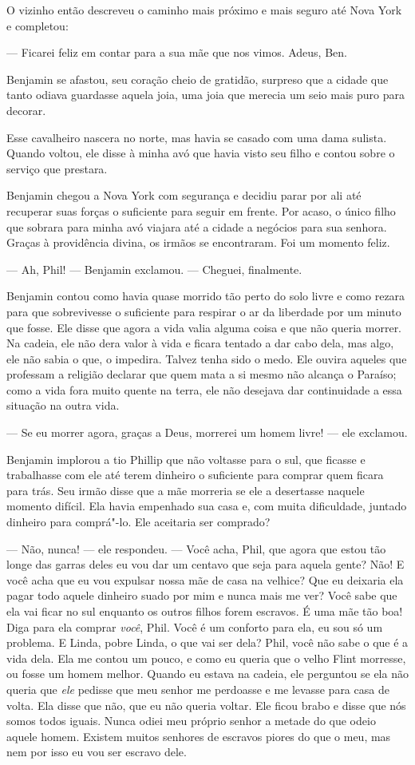 O vizinho então descreveu o caminho mais próximo e mais seguro até Nova
York e completou:

--- Ficarei feliz em contar para a sua mãe que nos vimos. Adeus, Ben.

Benjamin se afastou, seu coração cheio
de gratidão, surpreso que a cidade que tanto odiava guardasse aquela
joia, uma joia que merecia um seio mais puro para decorar.

Esse cavalheiro nascera no norte, mas
havia se casado com uma dama sulista. Quando voltou, ele disse à minha
avó que havia visto seu filho e contou sobre o serviço que prestara.

Benjamin chegou a Nova York com
segurança e decidiu parar por ali até recuperar suas forças o suficiente
para seguir em frente. Por acaso, o único filho que sobrara para minha
avó viajara até a cidade a negócios para sua senhora. Graças à
providência divina, os irmãos se encontraram. Foi um momento feliz.

--- Ah, Phil! --- Benjamin exclamou. --- Cheguei, finalmente.

Benjamin contou como havia quase morrido tão perto do solo livre e como
rezara para que sobrevivesse o suficiente para respirar o ar da
liberdade por um minuto que fosse. Ele disse que agora a vida valia
alguma coisa e que não queria morrer. Na cadeia, ele não dera valor à
vida e ficara tentado a dar cabo dela, mas algo, ele não sabia o que, o
impedira. Talvez tenha sido o medo. Ele ouvira aqueles que professam a
religião declarar que quem mata a si mesmo não alcança o Paraíso; como a
vida fora muito quente na terra, ele não desejava dar continuidade a
essa situação na outra vida.

--- Se eu morrer agora, graças a Deus, morrerei um homem livre! --- ele
exclamou.

Benjamin implorou a tio Phillip que não
voltasse para o sul, que ficasse e trabalhasse com ele até terem
dinheiro o suficiente para comprar quem ficara para trás. Seu irmão
disse que a mãe morreria se ele a desertasse naquele momento difícil.
Ela havia empenhado sua casa e, com muita dificuldade, juntado dinheiro
para comprá"-lo. Ele aceitaria ser comprado?

--- Não, nunca! --- ele respondeu. ---
Você acha, Phil, que agora que estou tão longe das garras deles eu vou
dar um centavo que seja para aquela gente? Não! E você acha que eu vou
expulsar nossa mãe de casa na velhice? Que eu deixaria ela pagar todo
aquele dinheiro suado por mim e nunca mais me ver? Você sabe que ela vai
ficar no sul enquanto os outros filhos forem escravos. É uma mãe tão
boa! Diga para ela comprar \emph{você}, Phil. Você é um conforto para
ela, eu sou só um problema. E Linda, pobre Linda, o que vai ser dela?
Phil, você não sabe o que é a vida dela. Ela me contou um pouco, e como
eu queria que o velho Flint morresse, ou fosse um homem melhor. Quando
eu estava na cadeia, ele perguntou se ela não queria que \emph{ele}
pedisse que meu senhor me perdoasse e me levasse para casa de volta. Ela
disse que não, que eu não queria voltar. Ele ficou brabo e disse que nós
somos todos iguais. Nunca odiei meu próprio senhor a metade do que odeio
aquele homem. Existem muitos senhores de escravos piores do que o meu,
mas nem por isso eu vou ser escravo dele.

